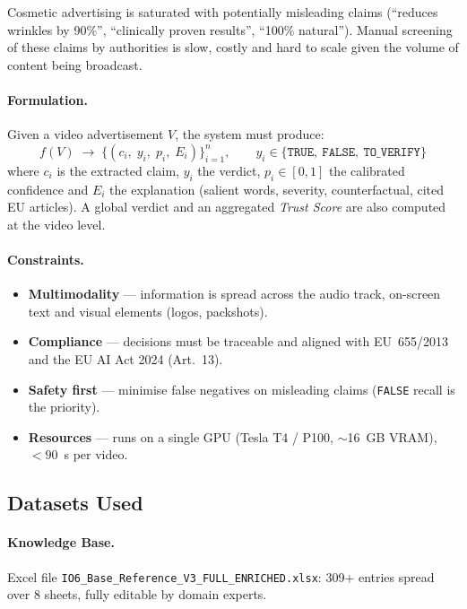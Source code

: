 \documentclass[11pt,a4paper]{article}
\newcommand{\verdict}[1]{\texttt{#1}}
\begin{document}
Cosmetic advertising is saturated with potentially misleading claims
(``reduces wrinkles by 90\%'', ``clinically proven results'', ``100\% natural'').
Manual screening of these claims by authorities is slow, costly and hard to scale
given the volume of content being broadcast.

\paragraph{Formulation.}
Given a video advertisement $V$, the system must produce:
\[
  f(V) \;\longrightarrow\; \big\{ (c_i,\; y_i,\; p_i,\; E_i) \big\}_{i=1}^{n},
  \qquad y_i \in \{\verdict{TRUE},\ \verdict{FALSE},\ \verdict{TO\_VERIFY}\}
\]
where $c_i$ is the extracted claim, $y_i$ the verdict, $p_i \in [0,1]$ the
calibrated confidence and $E_i$ the explanation (salient words, severity,
counterfactual, cited EU articles). A global verdict and an aggregated
\emph{Trust Score} are also computed at the video level.

\paragraph{Constraints.}
\begin{itemize}[noitemsep]
  \item \textbf{Multimodality} --- information is spread across the audio track,
  on-screen text and visual elements (logos, packshots).
  \item \textbf{Compliance} --- decisions must be traceable and aligned with
  EU~655/2013 and the EU AI Act 2024 (Art.~13).
  \item \textbf{Safety first} --- minimise false negatives on misleading claims
  (\verdict{FALSE} recall is the priority).
  \item \textbf{Resources} --- runs on a single GPU (Tesla T4 / P100,
  $\sim$16~GB VRAM), $<\!90$~s per video.
\end{itemize}

\subsection{Datasets Used}

\paragraph{Knowledge Base.}
Excel file \texttt{IO6\_Base\_Reference\_V3\_FULL\_ENRICHED.xlsx}: 309+ entries
spread over 8 sheets, fully editable by domain experts.
\end{document}
